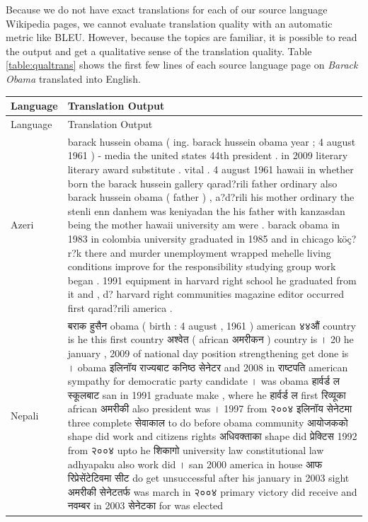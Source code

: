 \documentclass[11pt]{article}
\begin{document}
Because we do not have exact translations for each of our source language Wikipedia pages, we cannot evaluate translation quality with an automatic metric like BLEU. However, because the topics are familiar, it is possible to read the output and get a qualitative sense of the translation quality. Table \ref{table:qualtrans} shows the first few lines of each source language page on {\it Barack Obama} translated into English.

\onecolumn
\begin{center}
\begin{longtable}{|p{1.5cm}|p{13cm}|}
\hline
Language & Translation Output \\
\endfirsthead
\hline
Language & Translation Output \\
\endhead
\hline
Azeri & {barack hussein obama ( ing. barack hussein obama year ; 4 august 1961 ) - media the united states 44th president . 
in 2009 literary literary award substitute .  vital . 4 august 1961 hawaii in whether born the barack hussein gallery qarad?rili father ordinary also barack hussein obama ( father ) , a?d?rili his mother ordinary the stenli enn danhem was keniyadan the his father with kanzasdan being the mother hawaii university am were . barack obama in 1983 in colombia university graduated in 1985 and in chicago köç?r?k there and murder unemployment wrapped mehelle living conditions improve for the responsibility studying group work began . 1991 equipment in harvard right school he graduated from it and , d? harvard right communities magazine editor occurred first qarad?rili america .} \\
\hline
Nepali & {बराक हुसैन obama ( birth : 4 august , 1961 ) american ४४औं country is he this first country अश्वेत ( african अमरीकन ) country is । 20 he january , 2009 of national day position strengthening get done is । obama इलिनॉय राज्यबाट कनिष्ठ सेनेटर and 2008 in राष्टपति american sympathy for democratic party candidate । was obama हार्वर्ड ल स्कूलबाट san in 1991 graduate make , where he हार्वर्ड ल first रिव्यूका african अमरीकी also president was । 1997 from २००४ इलिनॉय सेनेटमा three complete सेवाकाल to do before obama community आयोजकको shape did work and citizens rights अधिवक्ताका shape did प्रेक्टिस 1992 from २००४ upto he शिकागो university law constitutional law adhyapaku also work did । san 2000 america in house आफ रिप्रेसेंटेटिवमा सीट do get unsuccessful after his january in 2003 sight अमरीकी सेनेटतर्फ was march in २००४ primary victory did receive and नवम्बर in 2003 सेनेटका for was elected}\\

\end{longtable}
\end{center}
\end{document}
